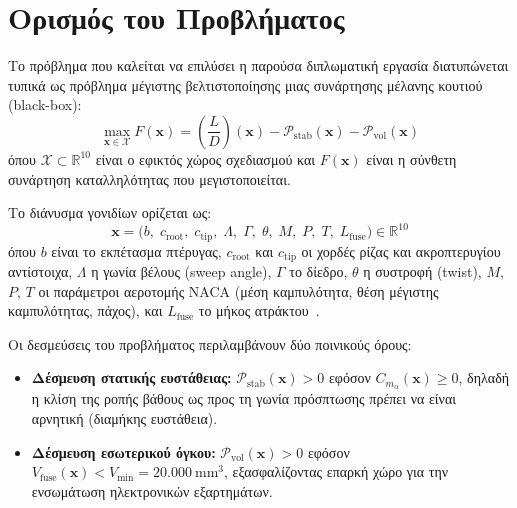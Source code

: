 \section{Ορισμός του Προβλήματος}
\label{sec:intro_problem}

Το πρόβλημα που καλείται να επιλύσει η παρούσα διπλωματική εργασία διατυπώνεται τυπικά ως πρόβλημα μέγιστης βελτιστοποίησης μιας συνάρτησης μέλανης κουτιού (black-box):
\begin{equation}
\label{eq:opt_problem}
\max_{\mathbf{x} \in \mathcal{X}} F(\mathbf{x}) = \left(\frac{L}{D}\right)(\mathbf{x}) - \mathcal{P}_{\text{stab}}(\mathbf{x}) - \mathcal{P}_{\text{vol}}(\mathbf{x})
\end{equation}
όπου $\mathcal{X} \subset \mathbb{R}^{10}$ είναι ο εφικτός χώρος σχεδιασμού και $F(\mathbf{x})$ είναι η σύνθετη συνάρτηση καταλληλότητας που μεγιστοποιείται.

Το διάνυσμα γονιδίων ορίζεται ως:
\begin{equation}
\label{eq:gene_vector}
\mathbf{x} = \bigl(b,\; c_{\text{root}},\; c_{\text{tip}},\; \Lambda,\; \Gamma,\; \theta,\; M,\; P,\; T,\; L_{\text{fuse}}\bigr) \in \mathbb{R}^{10}
\end{equation}
όπου $b$ είναι το εκπέτασμα πτέρυγας, $c_{\text{root}}$ και $c_{\text{tip}}$ οι χορδές ρίζας και ακροπτερυγίου αντίστοιχα, $\Lambda$ η γωνία βέλους (sweep angle), $\Gamma$ το δίεδρο, $\theta$ η συστροφή (twist), $M$, $P$, $T$ οι παράμετροι αεροτομής NACA (μέση καμπυλότητα, θέση μέγιστης καμπυλότητας, πάχος), και $L_{\text{fuse}}$ το μήκος ατράκτου~\cite{kulfan2008cst,abbott1959theory}.

Οι δεσμεύσεις του προβλήματος περιλαμβάνουν δύο ποινικούς όρους:
\begin{itemize}
    \item \textbf{Δέσμευση στατικής ευστάθειας:} $\mathcal{P}_{\text{stab}}(\mathbf{x}) > 0$ εφόσον $C_{m_\alpha}(\mathbf{x}) \geq 0$, δηλαδή η κλίση της ροπής βάθους ως προς τη γωνία πρόσπτωσης πρέπει να είναι αρνητική (διαμήκης ευστάθεια).
    \item \textbf{Δέσμευση εσωτερικού όγκου:} $\mathcal{P}_{\text{vol}}(\mathbf{x}) > 0$ εφόσον $V_{\text{fuse}}(\mathbf{x}) < V_{\min} = 20.000\ \text{mm}^3$, εξασφαλίζοντας επαρκή χώρο για την ενσωμάτωση ηλεκτρονικών εξαρτημάτων.
\end{itemize}

